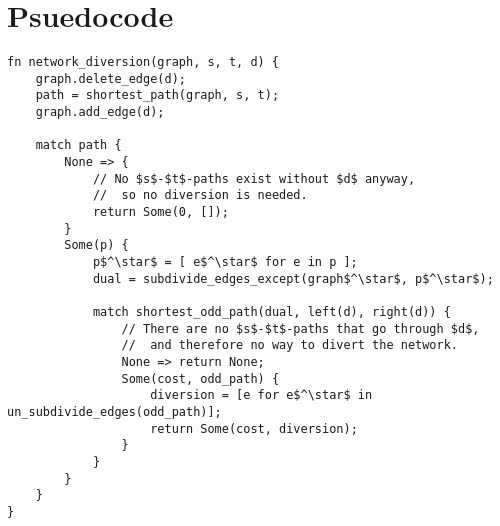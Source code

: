 \section{Psuedocode}

\begin{lstlisting}[caption={Main},label=Listing,mathescape=true]
fn network_diversion(graph, s, t, d) {
    graph.delete_edge(d);
    path = shortest_path(graph, s, t);
    graph.add_edge(d);

    match path {
        None => {
            // No $s$-$t$-paths exist without $d$ anyway,
            //  so no diversion is needed.
            return Some(0, []);
        }
        Some(p) {
            p$^\star$ = [ e$^\star$ for e in p ];
            dual = subdivide_edges_except(graph$^\star$, p$^\star$);

            match shortest_odd_path(dual, left(d), right(d)) {
                // There are no $s$-$t$-paths that go through $d$,
                //  and therefore no way to divert the network.
                None => return None;
                Some(cost, odd_path) {
                    diversion = [e for e$^\star$ in un_subdivide_edges(odd_path)];
                    return Some(cost, diversion);
                }
            }
        }
    }
}
\end{lstlisting}
